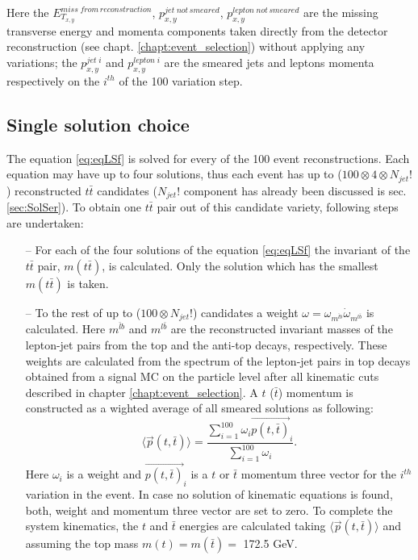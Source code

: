 Here the $E^{miss \; from \, reconstruction}_{T_{x,y}}$, $p^{jet \; not\,smeared}_{x,y}$, $p^{lepton\;not\,smeared}_{x,y}$ are the missing transverse energy and momenta
components taken directly from the detector reconstruction (see chapt. \ref{chapt:event_selection}) without applying any variations; the $p^{jet\;i}_{x,y}$ and $p^{lepton\;i}_{x,y}$
are the smeared jets and leptons momenta respectively on the $i^{th}$ of the 100 variation step.

\subsection{Single solution choice}

The equation \ref{eq:eqLSf} is solved for every of the 100 event reconstructions. Each equation may have up to four solutions, thus each event
has up to ($100 \otimes 4 \otimes N_{jet}!$) reconstructed $t\bar{t}$ candidates ($N_{jet}!$ component has already been discussed is sec. \ref{sec:SolSer}). 
To obtain one $t\bar{t}$ pair out of this candidate variety, following steps are undertaken:

\begin{itemize}
 \item [--] For each of the four solutions of the equation \ref{eq:eqLSf} the invariant of the $t\bar{t}$ pair, $m(t\bar{t})$, is calculated. Only
 the solution which has the smallest $m(t\bar{t})$ is taken. 
 \item [--] To the rest of up to ($100 \otimes N_{jet}!$) candidates a weight $\omega = \omega_{m^{\bar{l}b}} \dot \omega_{m^{l\bar{b}}}$
 is calculated. Here $m^{\bar{l}b}$ and $m^{l\bar{b}}$ are the reconstructed invariant masses of the lepton-jet pairs from the top and the anti-top 
 decays, respectively. These weights are calculated from the spectrum of the lepton-jet pairs in top decays obtained from a signal MC on the 
 particle level after all kinematic cuts described in chapter \ref{chapt:event_selection}. A $t$ ($\bar{t}$) momentum is constructed as a wighted 
 average of all smeared solutions as following:
 \begin{equation}
  \langle{\vec{p}(t,\bar{t})}\rangle = \frac{\sum\limits_{i=1}^{100} \omega_{i} \vec{p(t,\bar{t})}_i}{\sum\limits_{i=1}^{100} \omega_i}.
 \end{equation}
 Here $\omega_i$ is a weight and $\vec{p(t, \bar{t})}_{i}$ is a $t$ or $\bar{t}$ momentum three vector for the $i^{th}$ variation in the event. 
 In case no solution of kinematic equations is found, both, weight and momentum three vector are set to zero. To complete the system kinematics,
 the $t$ and $\bar{t}$ energies are calculated taking $\langle{\vec{p}(t,\bar{t})}\rangle$ and assuming the top mass $m(t) = m(\bar{t}) = $ 172.5 GeV.
\end{itemize}

